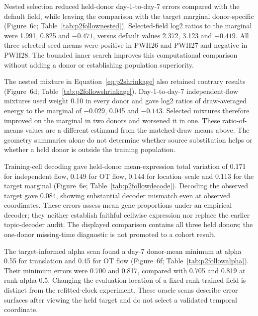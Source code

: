 \documentclass[10pt,a4paper]{article}
\begin{document}
Nested selection reduced held-donor day-1-to-day-7 errors compared with the default field, while leaving the comparison with the target marginal donor-specific (Figure~6c; Table~\ref{tab:p2follownested}). Selected-field log2 ratios to the marginal were 1.991, 0.825 and $-0.471$, versus default values 2.372, 3.123 and $-0.419$. All three selected seed means were positive in PWH26 and PWH27 and negative in PWH28. The bounded inner search improves this computational comparison without adding a donor or establishing population superiority.

The nested mixture in Equation~\eqref{eq:p2shrinkage} also retained contrary results (Figure~6d; Table~\ref{tab:p2followshrinkage}). Day-1-to-day-7 independent-flow mixtures used weight 0.10 in every donor and gave log2 ratios of draw-averaged energy to the marginal of $-0.029$, 0.045 and $-0.143$. Selected mixtures therefore improved on the marginal in two donors and worsened it in one. These ratio-of-means values are a different estimand from the matched-draw means above. The geometry summaries alone do not determine whether source substitution helps or whether a held donor is outside the training population.

Training-cell decoding gave held-donor mean-expression total variation of 0.171 for independent flow, 0.149 for OT flow, 0.144 for location--scale and 0.113 for the target marginal (Figure~6e; Table~\ref{tab:p2followdecode}). Decoding the observed target gave 0.084, showing substantial decoder mismatch even at observed coordinates. These errors assess mean gene proportions under an empirical decoder; they neither establish faithful cellwise expression nor replace the earlier topic-decoder audit. The displayed comparison contains all three held donors; the one-donor missing-time diagnostic is not promoted to a cohort result.

The target-informed alpha scan found a day-7 donor-mean minimum at alpha 0.55 for translation and 0.45 for OT flow (Figure~6f; Table~\ref{tab:p2followalpha}). Their minimum errors were 0.700 and 0.817, compared with 0.705 and 0.819 at rank alpha 0.5. Changing the evaluation location of a fixed rank-trained field is distinct from the refitted-clock experiment. These oracle scans describe error surfaces after viewing the held target and do not select a validated temporal coordinate.

\end{document}
